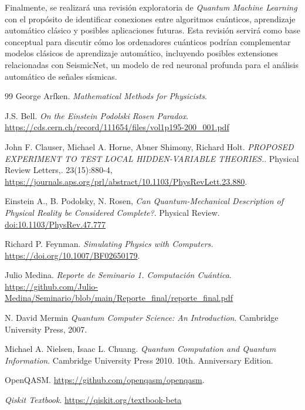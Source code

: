 \documentclass[a4paper]{article}
\begin{document}
Finalmente, se realizará una revisión exploratoria de \textit{Quantum Machine Learning} con el propósito de identificar conexiones entre algoritmos cuánticos, aprendizaje automático clásico y posibles aplicaciones futuras. Esta revisión servirá como base conceptual para discutir cómo los ordenadores cuánticos podrían complementar modelos clásicos de aprendizaje automático, incluyendo posibles extensiones relacionadas con SeismicNet, un modelo de red neuronal profunda para el análisis automático de señales sísmicas.

\begin{thebibliography}{99}
 George Arfken. \textit{Mathematical Methods for Physicists}.

 J.S. Bell. \textit{On the Einstein Podolski Rosen Paradox}. \url{https://cds.cern.ch/record/111654/files/vol1p195-200_001.pdf}

 John F. Clauser, Michael A. Horne, Abner Shimony, Richard Holt. \textit{PROPOSED EXPERIMENT TO TEST LOCAL HIDDEN-VARIABLE THEORIES.}. Physical Review Letters,. 23(15):880-4, \url{https://journals.aps.org/prl/abstract/10.1103/PhysRevLett.23.880}.

 Einstein A., B. Podolsky, N. Rosen, \textit{Can Quantum-Mechanical Description of Physical Reality be Considered Complete?}. Physical Review. \url{doi:10.1103/PhysRev.47.777}

 Richard P. Feynman. \textit{Simulating Physics with Computers.} \url{https://doi.org/10.1007/BF02650179}.

 Julio Medina. \textit{Reporte de Seminario 1. Computación Cuántica}. \url{https://github.com/Julio-Medina/Seminario/blob/main/Reporte_final/reporte_final.pdf}

 N. David Mermin \textit{Quantum Computer Science: An Introduction}. Cambridge University Press, 2007.

 Michael A. Nielsen, Isaac L. Chuang. \textit{Quantum Computation and Quantum Information}. Cambridge University Press 2010. 10th. Anniversary Edition.


 OpenQASM. \url{https://github.com/openqasm/openqasm}.

 \textit{Qiskit Textbook}. \url{https://qiskit.org/textbook-beta}



\end{thebibliography}
\end{document}
